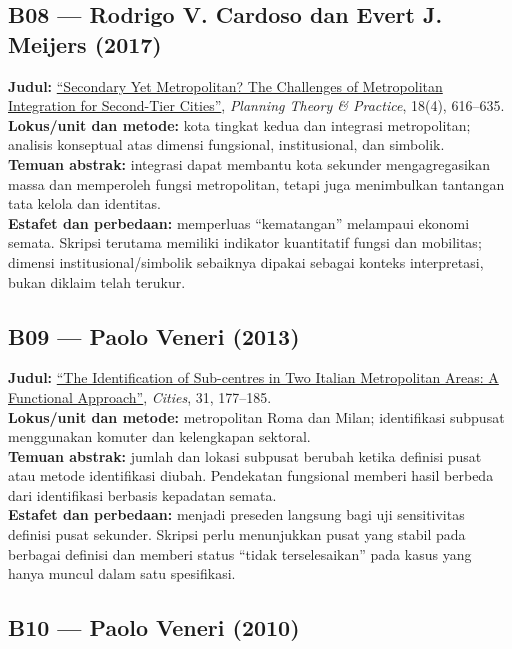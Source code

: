 \documentclass[
  indonesian,
  11pt,
  a4paper,
  oneside,
  openany]{report}
\begin{document}
\subsection{B08 --- Rodrigo V. Cardoso dan Evert J. Meijers
(2017)}\label{b08-rodrigo-v.-cardoso-dan-evert-j.-meijers-2017}

\textbf{Judul:}
\href{https://doi.org/10.1080/14649357.2017.1371789}{``Secondary Yet
Metropolitan? The Challenges of Metropolitan Integration for Second-Tier
Cities''}, \emph{Planning Theory \& Practice}, 18(4), 616--635.\\
\textbf{Lokus/unit dan metode:} kota tingkat kedua dan integrasi
metropolitan; analisis konseptual atas dimensi fungsional,
institusional, dan simbolik.\\
\textbf{Temuan abstrak:} integrasi dapat membantu kota sekunder
mengagregasikan massa dan memperoleh fungsi metropolitan, tetapi juga
menimbulkan tantangan tata kelola dan identitas.\\
\textbf{Estafet dan perbedaan:} memperluas ``kematangan'' melampaui
ekonomi semata. Skripsi terutama memiliki indikator kuantitatif fungsi
dan mobilitas; dimensi institusional/simbolik sebaiknya dipakai sebagai
konteks interpretasi, bukan diklaim telah terukur.

\subsection{B09 --- Paolo Veneri (2013)}\label{b09-paolo-veneri-2013}

\textbf{Judul:}
\href{https://doi.org/10.1016/j.cities.2012.04.006}{``The Identification
of Sub-centres in Two Italian Metropolitan Areas: A Functional
Approach''}, \emph{Cities}, 31, 177--185.\\
\textbf{Lokus/unit dan metode:} metropolitan Roma dan Milan;
identifikasi subpusat menggunakan komuter dan kelengkapan sektoral.\\
\textbf{Temuan abstrak:} jumlah dan lokasi subpusat berubah ketika
definisi pusat atau metode identifikasi diubah. Pendekatan fungsional
memberi hasil berbeda dari identifikasi berbasis kepadatan semata.\\
\textbf{Estafet dan perbedaan:} menjadi preseden langsung bagi uji
sensitivitas definisi pusat sekunder. Skripsi perlu menunjukkan pusat
yang stabil pada berbagai definisi dan memberi status ``tidak
terselesaikan'' pada kasus yang hanya muncul dalam satu spesifikasi.

\subsection{B10 --- Paolo Veneri (2010)}\label{b10-paolo-veneri-2010}
\end{document}

